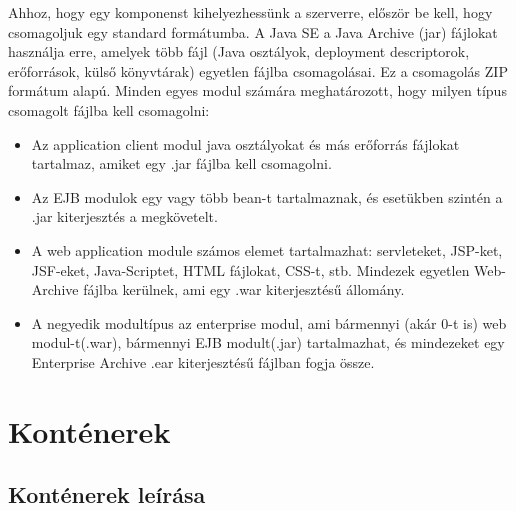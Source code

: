 \documentclass[centeredchapter]{thesis-ekf}
\theoremstyle{definition}
\theoremstyle{remark}
\begin{document}
Ahhoz, hogy egy komponenst kihelyezhessünk a szerverre, először be kell, hogy csomagoljuk egy standard formátumba. A Java SE a Java Archive (jar) fájlokat használja erre, amelyek több fájl (Java osztályok, deployment descriptorok, erőforrások, külső könyvtárak) egyetlen fájlba csomagolásai. Ez a csomagolás ZIP formátum alapú.
Minden egyes modul számára meghatározott, hogy milyen típus csomagolt fájlba kell csomagolni:
\begin{itemize}
	\item Az application client modul java osztályokat és más erőforrás fájlokat tartalmaz, amiket egy .jar fájlba kell csomagolni.
	
	\item Az EJB modulok egy vagy több bean-t tartalmaznak, és esetükben szintén a .jar kiterjesztés a megkövetelt.
	
	\item A web application module számos elemet tartalmazhat: servleteket, JSP-ket, JSF-eket, Java-Scriptet, HTML fájlokat, CSS-t, stb. Mindezek egyetlen Web-Archive fájlba kerülnek, ami egy .war kiterjesztésű állomány.
	
	\item A negyedik modultípus az enterprise modul, ami bármennyi (akár 0-t is) web modul-t(.war), bármennyi EJB modult(.jar) tartalmazhat, és mindezeket egy Enterprise Archive .ear kiterjesztésű fájlban fogja össze.
	
\end{itemize} 

\section{Konténerek}

\subsection{Konténerek leírása}
\end{document}
